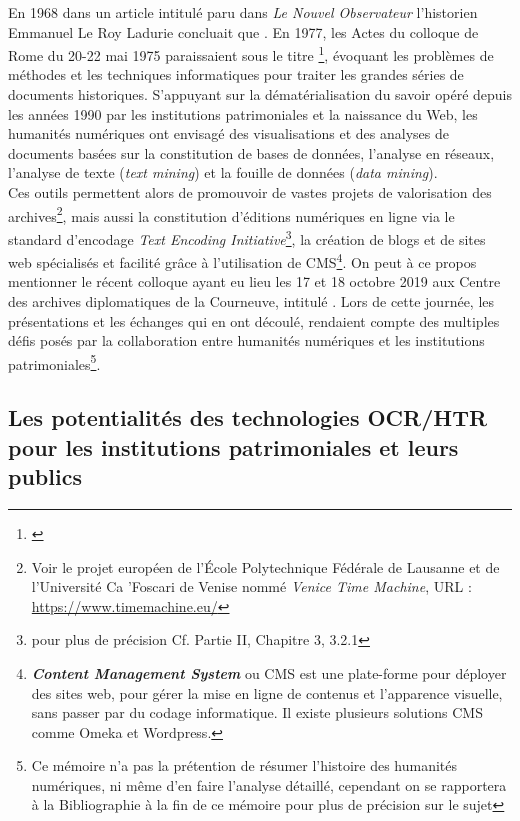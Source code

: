 En 1968 dans un article intitulé  paru dans \textit{Le Nouvel Observateur} l'historien Emmanuel Le Roy Ladurie concluait que . En 1977, les Actes du colloque de Rome du 20-22 mai 1975 paraissaient sous le titre \footnote{\cite{noauthor_informatique_1977}}, évoquant les problèmes de méthodes et les techniques informatiques pour traiter les grandes séries de documents historiques. S'appuyant sur la dématérialisation du savoir opéré depuis les années 1990 par les institutions patrimoniales et la naissance du Web, les humanités numériques ont envisagé des visualisations et des analyses de documents basées sur la constitution de bases de données, l'analyse en réseaux, l'analyse de texte (\textit{text mining}) et la fouille de données (\textit{data mining}).\\

Ces outils permettent alors de promouvoir de vastes projets de valorisation des archives\footnote{Voir le projet européen de l'École Polytechnique Fédérale de Lausanne et de l'Université Ca 'Foscari de Venise nommé  \textit{Venice Time Machine}, URL : \url{https://www.timemachine.eu/}}, mais aussi la constitution d'éditions numériques en ligne via le standard d'encodage \textit{Text Encoding Initiative}\footnote{pour plus de précision Cf. Partie II, Chapitre 3, 3.2.1}, la création de blogs et de sites web spécialisés et facilité grâce à l'utilisation de CMS\footnote{\textbf{\textit{Content Management System}} ou CMS est une plate-forme pour déployer des sites web, pour gérer la mise en ligne de contenus et l'apparence visuelle, sans passer par du codage informatique. Il existe plusieurs solutions CMS comme Omeka et Wordpress.}. On peut à ce propos mentionner le récent colloque ayant eu lieu les 17 et 18 octobre 2019 aux Centre des archives diplomatiques de la Courneuve, intitulé . Lors de cette journée, les présentations et les échanges qui en ont découlé, rendaient compte des multiples défis posés par la collaboration entre humanités numériques et les institutions patrimoniales\footnote{Ce mémoire n'a pas la prétention de résumer l'histoire des humanités numériques, ni même d'en faire l'analyse détaillé, cependant on se rapportera à la Bibliographie à la fin de ce mémoire pour plus de précision sur le sujet}.

\subsection{Les potentialités des technologies OCR/HTR pour les institutions patrimoniales et leurs publics} 

